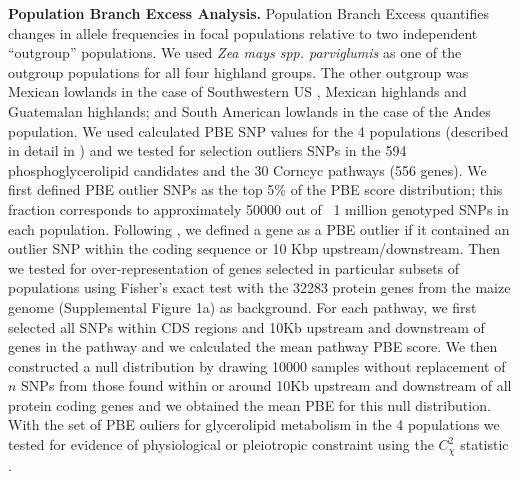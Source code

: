 \documentclass[9pt,twocolumn,twoside,lineno]{BioRxiv}
\begin{document}
\textbf{Population Branch Excess Analysis.}
Population Branch Excess quantifies changes in allele frequencies in focal populations relative to two independent “outgroup” populations.
We used \textit{Zea mays spp. parviglumis} as one of the outgroup populations for all four highland groups.  
The other outgroup was  Mexican lowlands  in the case of Southwestern US , Mexican highlands and Guatemalan highlands; and South American lowlands in the case of the Andes population. 
We used calculated PBE SNP values for the 4 populations (described in detail in \cite{Wang2020-mp}) and we tested for selection outliers SNPs in the 594 phosphoglycerolipid candidates and the 30 Corncyc pathways (556 genes).
We first defined PBE outlier SNPs as the top 5\% of the PBE score distribution; this fraction corresponds to approximately 50000 out of ~1 million genotyped SNPs in each population. 
Following \cite{Wang2020-mp}, we defined a gene as a PBE outlier if it contained an outlier SNP within the coding sequence or 10 Kbp upstream/downstream. 
Then we tested for over-representation of genes selected in particular subsets of populations using Fisher's exact test with the 32283 protein genes from the maize genome (Supplemental Figure 1a) \cite{wang2015a} as background. 
For each pathway, we first selected all SNPs within CDS regions and 10Kb upstream and downstream of genes in the pathway and we calculated the mean pathway PBE score. 
We then constructed a null distribution by drawing 10000 samples without replacement of $n$ SNPs from those found within or around 10Kb upstream and downstream of all protein coding genes and we obtained the mean PBE for this null distribution. 
With the set of PBE ouliers for glycerolipid metabolism in the 4 populations we tested for evidence of physiological or pleiotropic constraint using the $C_\chi^2$ statistic \cite{yeaman2018}. 
\end{document}
